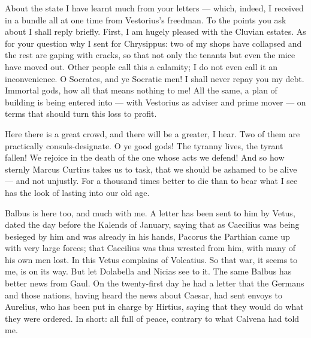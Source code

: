 

 About the state I have learnt much from your letters --- which, indeed, I received in a bundle all at one time from Vestorius's freedman. To the points you ask about I shall reply briefly. First, I am hugely pleased with the Cluvian estates. As for your question why I sent for Chrysippus: two of my shops have collapsed and the rest are gaping with cracks, so that not only the tenants but even the mice have moved out. Other people call this a calamity; I do not even call it an inconvenience. O Socrates, and ye Socratic men! I shall never repay you my debt. Immortal gods, how all that means nothing to me! All the same, a plan of building is being entered into --- with Vestorius as adviser and prime mover --- on terms that should turn this loss to profit.

 Here there is a great crowd, and there will be a greater, I hear. Two of them are practically consuls-designate. O ye good gods! The tyranny lives, the tyrant fallen! We rejoice in the death of the one whose acts we defend! And so how sternly Marcus Curtius takes us to task, that we should be ashamed to be alive --- and not unjustly. For a thousand times better to die than to bear what I see has the look of lasting into our old age.

 Balbus is here too, and much with me. A letter has been sent to him by Vetus, dated the day before the Kalends of January, saying that as Caecilius was being besieged by him and was already in his hands, Pacorus the Parthian came up with very large forces; that Caecilius was thus wrested from him, with many of his own men lost. In this Vetus complains of Volcatius. So that war, it seems to me, is on its way. But let Dolabella and Nicias see to it. The same Balbus has better news from Gaul. On the twenty-first day he had a letter that the Germans and those nations, having heard the news about Caesar, had sent envoys to Aurelius, who has been put in charge by Hirtius, saying that they would do what they were ordered. In short: all full of peace, contrary to what Calvena had told me.
